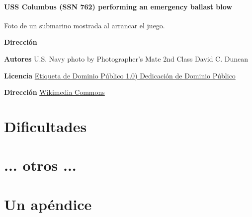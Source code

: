 \documentclass[a4paper,
	11pt,
	parskip=full,
	bibliography=totoc,
	twoside
	]{scrartcl}
\let\oldsection\section
\def\section{\cleardoubleoddpage\oldsection}
\renewcommand{\sectionmark}[1]{\markright{\thesection.\ #1}}
\begin{document}
	\paragraph{USS Columbus (SSN 762) performing an emergency ballast blow}
	Foto de un submarino mostrada al arrancar el juego.
	\begin{labeling}{\textbf{Dirección}}
		\item[\textbf{Autores}] U.S. Navy photo by Photographer's Mate 2nd Class David C. Duncan
		\item[\textbf{Licencia}] \href{https://creativecommons.org/publicdomain/mark/1.0/deed.es_ES}{Etiqueta de Dominio Público 1.0)
			Dedicación de Dominio Público}
		\item[\textbf{Dirección}]\href{https://commons.wikimedia.org/wiki/File:980604-N-7726D-002_Submarine_Emergency_Surfacing_Drill.jpg}{Wikimedia Commons}
	\end{labeling}

\section{Dificultades}
\label{sec:dificultades}

\section{ ... otros ...}

\cleardoubleoddpage
	\renewcommand{\sectionmark}[1]{}
\begin{thebibliography}{9}
	\raggedright
	
\end{thebibliography}
\markright{\appendixname}

\cleardoubleoddpage
\appendix
{}

\section{Un apéndice}
	\FloatBarrier
\end{document}
